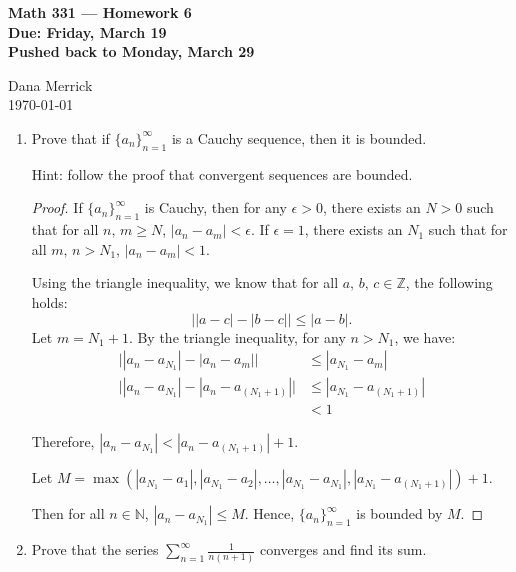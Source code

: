 \documentclass[12pt]{amsart}
\begin{document}
\thispagestyle{empty}

\begin{center}
{\bf Math 331  --- Homework 6 \\
Due:  Friday, March 19 \\
Pushed back to Monday, March 29}
\end{center}

\bigskip

\noindent
Dana Merrick \\
\today

\bigskip


\begin{enumerate}

\setlength{\itemsep}{6pt}


\item Prove that if $\{a_n\}_{n=1}^\infty$ is a Cauchy
  sequence, then it is bounded.

Hint:  follow the proof that convergent sequences are bounded.

\begin{proof}
If $\{a_n\}_{n=1}^\infty$ is Cauchy, then for any $\epsilon >0$, there exists an $N>0$ such that for all $n,\,m \ge N$, $|a_n -a_m| < \epsilon$. If $\epsilon = 1$, there exists an $N_1$ such that for all $m,\,n > N_1$, $|a_n -a_m| < 1$.

Using the triangle inequality, we know that for all $a,\,b,\,c\in\mathbb Z$, the following holds:
\[ \big| |a - c| - |b-c| \big| \le |a - b|. \]
Let $m = N_1 + 1$. By the triangle inequality, for any $n>N_1$, we have:
\begin{align*}
\big| |a_n - a_{N_1} | - |a_n - a_m | \big| &\le |a_{N_1} - a_m | \\
\big| |a_n - a_{N_1} | - |a_n - a_{(N_1 + 1)} | \big| &\le |a_{N_1} - a_{(N_1+1)} | \\
&<1 
\end{align*}

Therefore, $|a_n - a_{N_1}| < |a_n - a_{(N_1+1)}| + 1$.

Let $M=\max\left(|a_{N_1}-a_1|, |a_{N_1}-a_2|, \ldots, |a_{N_1}-a_{N_1}|, |a_{N_1}-a_{(N_1+1)}|\right) + 1$.

Then for all $n\in\mathbb N$, $|a_n - a_{N_1}| \le M$. Hence, $\{a_n\}_{n=1}^\infty$ is bounded by $M$.
\end{proof}

\item Prove that the series
%
$\displaystyle \sum_{n=1}^\infty \frac{1}{n(n+1)}$
%
converges and find its sum.


\end{enumerate}
\end{document}
